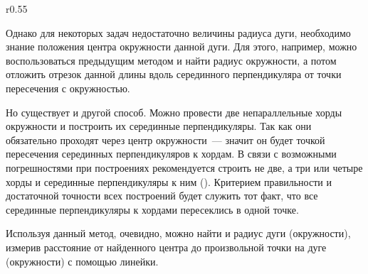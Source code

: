 \begin{wrapfigure}[15]{r}{0.55\tw}
    \centering
    \vspace{-1.5pc}
    \caption{}
    \label{pic:arc-radius-chords}
\end{wrapfigure}
Однако для некоторых задач недостаточно величины радиуса дуги, необходимо знание положения центра окружности данной дуги. Для этого, например, можно воспользоваться предыдущим методом и найти радиус окружности, а потом отложить отрезок данной длины вдоль серединного перпендикуляра от точки пересечения с окружностью.

Но существует и другой способ. Можно провести две непараллельные хорды окружности и построить их серединные перпендикуляры. Так как они обязательно проходят через центр окружности~--- значит он будет точкой пересечения серединных перпендикуляров к хордам. В связи с возможными погрешностями при построениях рекомендуется строить не две, а три или четыре хорды и серединные перпендикуляры к ним (). Критерием правильности и достаточной точности всех построений будет служить тот факт, что все серединные перпендикуляры к хордами пересеклись в одной точке.

Используя данный метод, очевидно, можно найти и радиус дуги (окружности), измерив расстояние от найденного  центра до произвольной точки на дуге (окружности) с помощью линейки.

